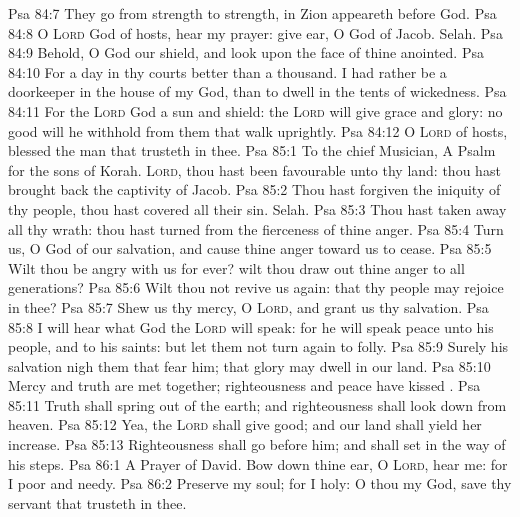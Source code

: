 \vs Psa 84:7 They go from strength to strength,  in Zion appeareth before God.
\vs Psa 84:8 O \textsc{Lord} God of hosts, hear my prayer: give ear, O God of Jacob. Selah.
\vs Psa 84:9 Behold, O God our shield, and look upon the face of thine anointed.
\vs Psa 84:10 For a day in thy courts  better than a thousand. I had rather be a doorkeeper in the house of my God, than to dwell in the tents of wickedness.
\vs Psa 84:11 For the \textsc{Lord} God  a sun and shield: the \textsc{Lord} will give grace and glory: no good  will he withhold from them that walk uprightly.
\vs Psa 84:12 O \textsc{Lord} of hosts, blessed  the man that trusteth in thee.
\vs Psa 85:1 To the chief Musician, A Psalm for the sons of Korah. \textsc{Lord}, thou hast been favourable unto thy land: thou hast brought back the captivity of Jacob.
\vs Psa 85:2 Thou hast forgiven the iniquity of thy people, thou hast covered all their sin. Selah.
\vs Psa 85:3 Thou hast taken away all thy wrath: thou hast turned  from the fierceness of thine anger.
\vs Psa 85:4 Turn us, O God of our salvation, and cause thine anger toward us to cease.
\vs Psa 85:5 Wilt thou be angry with us for ever? wilt thou draw out thine anger to all generations?
\vs Psa 85:6 Wilt thou not revive us again: that thy people may rejoice in thee?
\vs Psa 85:7 Shew us thy mercy, O \textsc{Lord}, and grant us thy salvation.
\vs Psa 85:8 I will hear what God the \textsc{Lord} will speak: for he will speak peace unto his people, and to his saints: but let them not turn again to folly.
\vs Psa 85:9 Surely his salvation  nigh them that fear him; that glory may dwell in our land.
\vs Psa 85:10 Mercy and truth are met together; righteousness and peace have kissed .
\vs Psa 85:11 Truth shall spring out of the earth; and righteousness shall look down from heaven.
\vs Psa 85:12 Yea, the \textsc{Lord} shall give  good; and our land shall yield her increase.
\vs Psa 85:13 Righteousness shall go before him; and shall set  in the way of his steps.
\vs Psa 86:1 A Prayer of David. Bow down thine ear, O \textsc{Lord}, hear me: for I  poor and needy.
\vs Psa 86:2 Preserve my soul; for I  holy: O thou my God, save thy servant that trusteth in thee.
